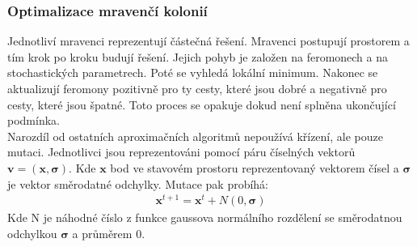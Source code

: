 \subsubsection{Optimalizace mravenčí kolonií}
Jednotliví mravenci reprezentují částečná řešení. Mravenci postupují prostorem a tím krok po kroku budují řešení. Jejich pohyb je založen na feromonech a na 
stochastických parametrech. Poté se vyhledá lokální minimum. Nakonec se aktualizují feromony pozitivně pro ty cesty, které jsou dobré a negativně pro cesty, které
jsou špatné. Toto proces se opakuje dokud není splněna ukončující podmínka.\\
Narozdíl od ostatních aproximačních algoritmů nepoužívá křízení, ale pouze mutaci. Jednotlivci jsou reprezentováni pomocí páru číselných vektorů \(\mathbf{v} =
(\mathbf{x},\boldsymbol{\sigma})\). Kde \(\mathbf{x}\) bod ve stavovém prostoru reprezentovaný vektorem čísel a \(\boldsymbol{\sigma}\) je vektor směrodatné 
odchylky. Mutace pak probíhá:\\
\begin{gather*}
    \mathbf{x}^{t+1} = \mathbf{x}^t + N(0, \boldsymbol{\sigma})
\end{gather*}
Kde N je náhodné číslo z funkce gaussova normálního rozdělení se směrodatnou odchylkou \(\boldsymbol{\sigma}\) a průměrem 0.